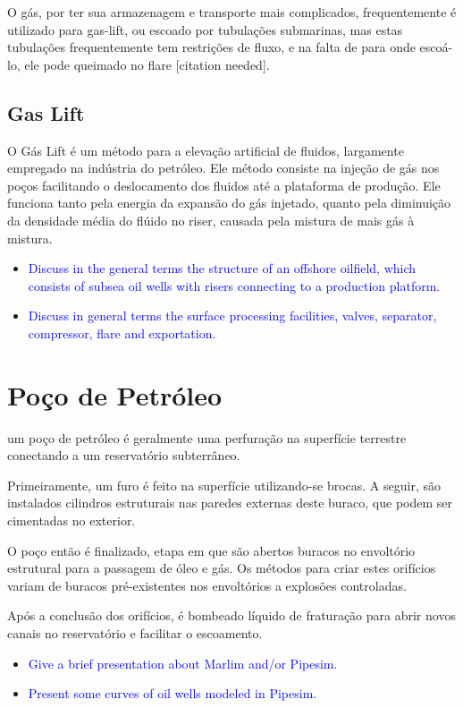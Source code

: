 O gás, por ter sua armazenagem e transporte mais complicados, frequentemente é utilizado para gas-lift, ou escoado por tubulações submarinas, mas estas tubulações frequentemente tem restrições de fluxo, e na falta de para onde escoá-lo, ele pode queimado no flare [citation needed].

\subsection{Gas Lift}
 O Gás Lift é um método para a elevação artificial de
fluidos, largamente empregado na indústria do petróleo. Ele método consiste na
injeção de gás nos poços facilitando o deslocamento dos fluidos até a plataforma de produção. Ele funciona tanto pela energia da expansão do gás injetado, quanto pela diminuição da densidade média do flúido no riser, causada pela mistura de mais gás à mistura.


\begin{itemize}

\item \textcolor{blue}{Discuss in the general terms the structure of an offshore oilfield, which consists of subsea oil wells with risers connecting to a production platform.}


\item \textcolor{blue}{Discuss in general terms the surface processing facilities, valves, separator, compressor, flare and exportation.}

\end{itemize}



\section{Poço de Petróleo}

um poço de petróleo é geralmente uma perfuração na superfície terrestre conectando a um reservatório subterrâneo. 

Primeiramente, um furo é feito na superfície utilizando-se brocas. A seguir, são instalados cilindros estruturais nas paredes externas deste buraco, que podem ser cimentadas no exterior. 

O poço então é finalizado, etapa em que são abertos buracos no envoltório estrutural para a passagem de óleo e gás. Os métodos para criar estes orifícios variam de buracos pré-existentes nos envoltórios a explosões controladas.

Após a conclusão dos orifícios, é bombeado líquido de fraturação para abrir novos canais no reservatório e facilitar o escoamento.



\begin{itemize}

\item \textcolor{blue}{Give a brief presentation about Marlim and/or Pipesim.}

\item \textcolor{blue}{Present some curves of oil wells modeled in Pipesim.}


\end{itemize}
